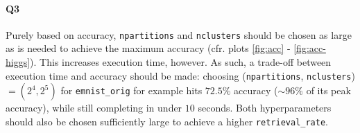 \documentclass[10pt]{article}
\begin{document}
\vspace{-.8cm}
\paragraph{Q3} Purely based on accuracy, \texttt{npartitions} and \texttt{nclusters} should be chosen as large as is needed to achieve the maximum accuracy (cfr. plots \ref{fig:acc} - \ref{fig:acc-higgs}). This increases execution time, however. As such, a trade-off between execution time and accuracy should be made: choosing (\texttt{npartitions}, \texttt{nclusters}) $= (2^4, 2^5)$ for \texttt{emnist\_orig} for example hits $72.5\%$ accuracy ($\sim 96\%$ of its peak accuracy), while still completing in under $10$ seconds. Both hyperparameters should also be chosen sufficiently large to achieve a higher \texttt{retrieval\_rate}.

\vspace{-.35cm}
\end{document}
